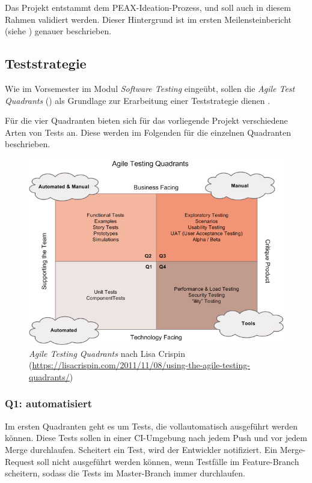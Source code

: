 Das Projekt entstammt dem PEAX-Ideation-Prozess, und soll auch in diesem Rahmen validiert werden. Dieser Hintergrund ist im ersten Meilensteinbericht (siehe ) genauer beschrieben.

\subsection{Teststrategie}

Wie im Vorsemester im Modul \textit{Software Testing} eingeübt, sollen die \textit{Agile Test Quadrants} () als Grundlage zur Erarbeitung einer Teststrategie dienen \cite[S. 242]{agiletest}.

Für die vier Quadranten bieten sich für das vorliegende Projekt verschiedene Arten von Tests an. Diese werden im Folgenden für die einzelnen Quadranten beschrieben.

\begin{figure}
	\centering
	\includegraphics[width=\linewidth]{pics/agile-testing-quadrants.png}
	\caption{\textit{Agile Testing Quadrants} nach Lisa Crispin (\url{https://lisacrispin.com/2011/11/08/using-the-agile-testing-quadrants/})}
	\label{fig:agile-testing-quadrants}
\end{figure}

\subsubsection{Q1: automatisiert}

Im ersten Quadranten geht es um Tests, die vollautomatisch ausgeführt werden können. Diese Tests sollen in einer CI-Umgebung nach jedem Push und vor jedem Merge durchlaufen. Scheitert ein Test, wird der Entwickler notifiziert. Ein Merge-Request soll nicht ausgeführt werden können, wenn Testfälle im Feature-Branch scheitern, sodass die Tests im Master-Branch immer durchlaufen.

